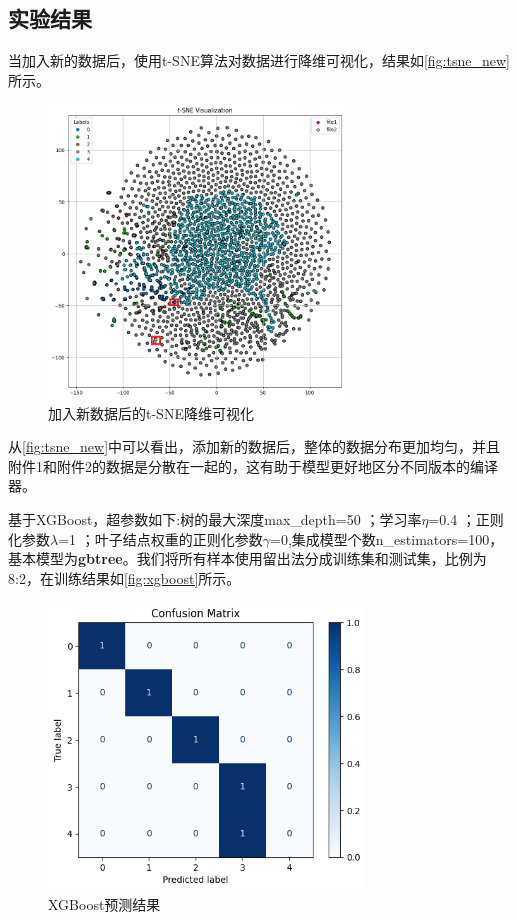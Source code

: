 \subsection{实验结果}
当加入新的数据后，使用t-SNE算法对数据进行降维可视化，结果如\autoref{fig:tsne_new}所示。
\begin{figure}[H]
	\centering
	\includegraphics[width=0.7\textwidth]{figures/tsne_new.png}
	\caption{加入新数据后的t-SNE降维可视化}
	\label{fig:tsne_new}
\end{figure}
从\autoref{fig:tsne_new}中可以看出，添加新的数据后，整体的数据分布更加均匀，并且附件1和附件2的数据是分散在一起的，这有助于模型更好地区分不同版本的编译器。
\par
基于XGBoost，超参数如下:树的最大深度max\_depth=50 ；学习率$\eta$=0.4 ；正则化参数$\lambda$=1 ；叶子结点权重的正则化参数$\gamma$=0,集成模型个数n\_estimators=100，基本模型为\textbf{gbtree}。我们将所有样本使用留出法分成训练集和测试集，比例为8:2，在训练结果如\autoref{fig:xgboost}所示。
\begin{figure}
	\centering
	\includegraphics[width=0.75\textwidth]{figures/xgb_predict.png}
	\caption{XGBoost预测结果}
	\label{fig:xgboost}
\end{figure}
